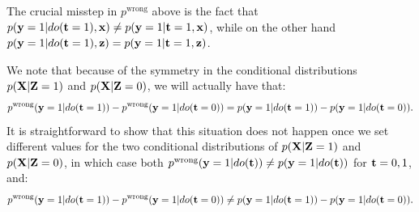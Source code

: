 The crucial misstep in $p^{\text{wrong}}$ above is the fact that
 $p(\mathbf{y}=1|do(\mathbf{t}=1),\mathbf{x}) \neq p(\mathbf{y}=1|\mathbf{t}=1,\mathbf{x})$, while on the other hand $p(\mathbf{y}=1|do(\mathbf{t}=1),\mathbf{z}) = p(\mathbf{y}=1|\mathbf{t}=1,\mathbf{z})$.
 
We note that because of the symmetry in the conditional distributions $p(\mathbf{X}|\mathbf{Z}=1)$ and $p(\mathbf{X}|\mathbf{Z}=0)$, we will actually have that:
$$p^{\text{wrong}}(\mathbf{y}=1|do(\mathbf{t}=1))  - p^{\text{wrong}}(\mathbf{y}=1|do(\mathbf{t}=0)) = p(\mathbf{y}=1|do(\mathbf{t}=1))  - p(\mathbf{y}=1|do(\mathbf{t}=0)).$$
 It is straightforward to show that this situation does not happen once we set different values for the two conditional distributions of $p(\mathbf{X}|\mathbf{Z}=1)$ and $p(\mathbf{X}|\mathbf{Z}=0)$, in which case both $p^{\text{wrong}}(\mathbf{y}=1|do(\mathbf{t})) \neq p(\mathbf{y}=1|do(\mathbf{t}))$ for $\mathbf{t}=0,1$, and: $$p^{\text{wrong}}(\mathbf{y}=1|do(\mathbf{t}=1))  - p^{\text{wrong}}(\mathbf{y}=1|do(\mathbf{t}=0)) \neq p(\mathbf{y}=1|do(\mathbf{t}=1))  - p(\mathbf{y}=1|do(\mathbf{t}=0)).$$
 